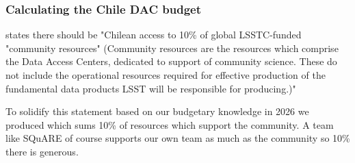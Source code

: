 \subsubsection{Calculating the Chile DAC budget}

 states there should be "Chilean access to 10\% of global LSSTC-funded "community resources" (Community
resources are the resources which comprise the Data Access Centers, dedicated to support
of community science. These do not include the operational resources required for
effective production of the fundamental data products LSST will be responsible for
producing.)"

To solidify this statement based on our budgetary knowledge in 2026 we produced 
which sums 10\% of resources which support the community.
A team like SQuARE of course supports our own team as much as the community so 10\% there is generous.




